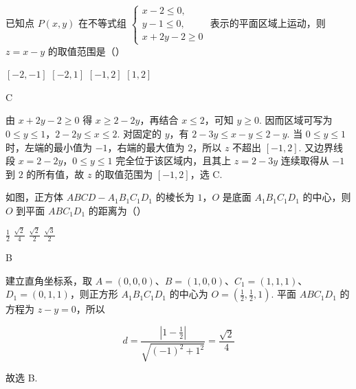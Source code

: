 \begin{problem}
已知点 \(P(x, y)\) 在不等式组 \(\begin{cases}
x - 2 \leqslant 0,\\
y - 1 \leqslant 0,\\
x + 2y - 2 \geqslant 0
\end{cases}\) 表示的平面区域上运动，则 \(z = x - y\) 的取值范围是（\quad）

\choices
    {\([-2, -1]\)}
    {\([-2, 1]\)}
    {\([-1, 2]\)}
    {\([1, 2]\)}

\begin{answer}
C
\end{answer}

\begin{solution}
由 \(x+2y-2\geqslant0\) 得 \(x\geqslant2-2y\)，再结合 \(x\leqslant2\)，可知 \(y\geqslant0\). 因而区域可写为 \(0\leqslant y\leqslant1\)，\(2-2y\leqslant x\leqslant2\). 对固定的 \(y\)，有 \(2-3y\leqslant x-y\leqslant2-y\). 当 \(0\leqslant y\leqslant1\) 时，左端的最小值为 \(-1\)，右端的最大值为 \(2\)，所以 \(z\) 不超出 \([-1,2]\). 又边界线段 \(x=2-2y\)，\(0\leqslant y\leqslant1\) 完全位于该区域内，且其上 \(z=2-3y\) 连续取得从 \(-1\) 到 \(2\) 的所有值，故 \(z\) 的取值范围为 \([-1,2]\)，选 C.
\end{solution}
\end{problem}

\begin{problem}
如图，正方体 \(ABCD - A_{1}B_{1}C_{1}D_{1}\) 的棱长为 \(1\)，\(O\) 是底面 \(A_{1}B_{1}C_{1}D_{1}\) 的中心，则 \(O\) 到平面 \(ABC_{1}D_{1}\) 的距离为（\quad）


\choices
    {\(\frac{1}{2}\)}
    {\(\frac{\sqrt{2}}{4}\)}
    {\(\frac{\sqrt{2}}{2}\)}
    {\(\frac{\sqrt{3}}{2}\)}

\begin{answer}
B
\end{answer}

\begin{solution}
建立直角坐标系，取 \(A=(0,0,0)\)、\(B=(1,0,0)\)、\(C_1=(1,1,1)\)、\(D_1=(0,1,1)\)，则正方形 \(A_1B_1C_1D_1\) 的中心为 \(O=\left(\frac12,\frac12,1\right)\). 平面 \(ABC_1D_1\) 的方程为 \(z-y=0\)，所以

\[
d=\frac{\left|1-\frac12\right|}{\sqrt{(-1)^2+1^2}}=\frac{\sqrt{2}}{4}
\]

故选 B.
\end{solution}
\end{problem}


